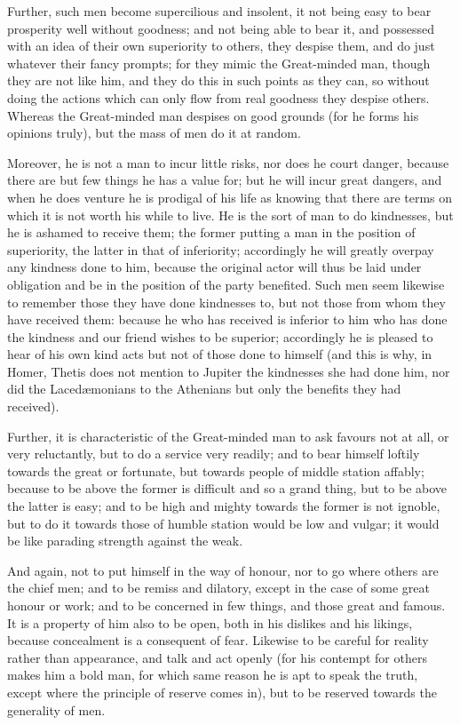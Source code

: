 Further, such men become supercilious and insolent, it not being easy to bear
prosperity well without goodness; and not being able to bear it, and possessed
with an idea of their own superiority to others, they despise them, and do just
whatever their fancy prompts; for they mimic the Great-minded man, though they
are not like him, and they do this in such points as they can, so without doing
the actions which can only flow from real goodness they despise others. Whereas
the Great-minded man despises on good grounds (for he forms his opinions
truly), but the mass of men do it at random.

Moreover, he is not a man to incur little risks, nor does he court danger,
because there are but few things he has a value for; but he will incur great
dangers, and when he does venture he is prodigal of his life as knowing that
there are terms on which it is not worth his while to live. He is the sort of
man to do kindnesses, but he is ashamed to receive them; the former putting a
man in the position of superiority, the latter in that of inferiority;
accordingly he will greatly overpay any kindness done to him, because the
original actor will thus be laid under obligation and be in the position of the
party benefited. Such men seem likewise to remember those they have done
kindnesses to, but not those from whom they have received them: because he who
has received is inferior to him who has done the kindness and our friend wishes
to be superior; accordingly he is pleased to hear of his own kind acts but not
of those done to himself (and this is why, in Homer, Thetis does not mention to
Jupiter the kindnesses she had done him, nor did the Lacedæmonians to the
Athenians but only the benefits they had received).

Further, it is characteristic of the Great-minded man to ask favours not at
all, or very reluctantly, but to do a service very readily; and to bear himself
loftily towards the great or fortunate, but towards people of middle station
affably; because to be above the former is difficult and so a grand thing, but
to be above the latter is easy; and to be high and mighty towards the former is
not ignoble, but to do it towards those of humble station would be low and
vulgar; it would be like parading strength against the weak.

And again, not to put himself in the way of honour, nor to go where others are
the chief men; and to be remiss and dilatory, except in the case of some great
honour or work; and to be concerned in few things, and those great and famous.
It is a property of him also to be open, both in his dislikes and his likings,
because concealment is a consequent of fear. Likewise to be careful for reality
rather than appearance, and talk and act openly (for his contempt for others
makes him a bold man, for which same reason he is apt to speak the truth,
except where the principle of reserve comes in), but to be reserved towards the
generality of men.

